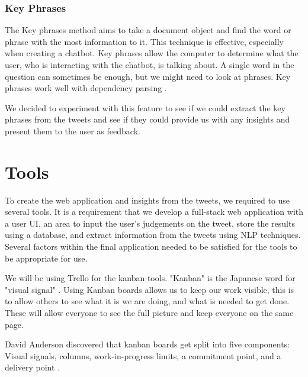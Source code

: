	\subsubsection{Key Phrases}
	The Key phrases method aims to take a document object and find the word or phrase with the most information to it. This technique is effective, especially when creating a chatbot. Key phrases allow the computer to determine what the user, who is interacting with the chatbot, is talking about. A single word in the question can sometimes be enough, but we might need to look at phrases. Key phrases work well with dependency parsing \cite{vasiliev2020natural}.
	
	We decided to experiment with this feature to see if we could extract the key phrases from the tweets and see if they could provide us with any insights and present them to the user as feedback.
	
	\section{Tools}
	To create the web application and insights from the tweets, we required to use several tools. It is a requirement that we develop a full-stack web application with a user UI, an area to input the user's judgements on the tweet, store the results using a database, and extract information from the tweets using NLP techniques. Several factors within the final application needed to be satisfied for the tools to be appropriate for use.
	
	We will be using Trello for the kanban tools. "Kanban" is the Japanese word for "visual signal" \cite{kanbanmeaning}. Using Kanban boards allows us to keep our work visible, this is to allow others to see what it is we are doing, and what is needed to get done. These will allow everyone to see the full picture and keep everyone on the same page.
	
	David Anderson discovered that kanban boards get split into five components: Visual signals, columns, work-in-progress limits, a commitment point, and a delivery point \cite{anderson2010kanban}.
	
